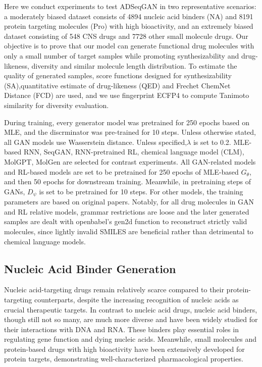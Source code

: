 \documentclass[10pt, twocolumn]{article}
\begin{document}
\renewcommand{\arraystretch}{1} %

Here we conduct experiments to test ADSeqGAN in two representative scenarios: a moderately biased dataset consists of 4894 nucleic acid binders (NA) and 8191 protein targeting molecules (Pro) with high bioactivity, and an extremely biased dataset consisting of 548 CNS drugs and 7728 other small molecule drugs. Our objective is to prove that our model can generate functional drug molecules with only a small number of target samples while promoting synthesizability and drug-likeness, diversity and similar molecule length distribution. To estimate the quality of generated samples, score functions designed for synthesizability (SA)\cite{Ertl2009},quantitative estimate of drug-likeness (QED)\cite{Lipinski2001,Bickerton2012,Ivanović2020} and Frechet ChemNet Distance (FCD)\cite{Preuer2018} are used, and we use fingerprint ECFP4\cite{Rogers2010} to compute Tanimoto similarity\cite{Nikolova2003} for diversity evaluation.

During training, every generator model was pretrained for 250 epochs based on MLE, and the discrminator was pre-trained for 10 steps. Unless otherwise stated, all GAN models use Wasserstein distance. Unless specified,$\lambda$ is set to 0.2. MLE-based RNN, SeqGAN, RNN-pretrained RL, chemical language model (CLM)\cite{Moret2020}, MolGPT\cite{Bagal2022}, MolGen\cite{Fang2023} are selected for contrast experiments. All GAN-related models and RL-based models are set to be pretrained for 250 epochs of MLE-based $G_{\theta}$, and then 50 epochs for downstream training. Meanwhile, in pretraining steps of GANs, $D_{\psi}$ is set to be pretrained for 10 steps. For other models, the training parameters are based on original papers. Notably, for all drug molecules in GAN and RL relative models, grammar restrictions are loose and the later generated samples are dealt with openbabel's gen2d function to reconstruct strictly valid molecules, since lightly invalid SMILES are beneficial rather than detrimental to chemical language models\cite{Skinnider2024}.

\subsection{Nucleic Acid Binder Generation}


Nucleic acid-targeting drugs remain relatively scarce compared to their protein-targeting counterparts, despite the increasing recognition of nucleic acids as crucial therapeutic targets. In contrast to nucleic acid drugs, nucleic acid binders, though still not so many, are much more diverse and have been widely studied for their interactions with DNA and RNA. These binders play essential roles in regulating gene function and dying nucleic acids. Meanwhile, small molecules and protein-based drugs with high bioactivity have been extensively developed for protein targets, demonstrating well-characterized pharmacological properties.
\end{document}
